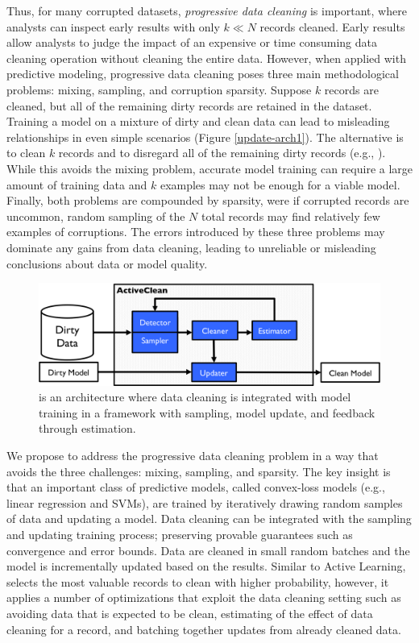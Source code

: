 Thus, for many corrupted datasets, \emph{progressive data cleaning} is important, where analysts can inspect early results with only $k \ll N$ records cleaned.
Early results allow analysts to judge the impact of an expensive or time consuming data cleaning operation without cleaning the entire data.
However, when applied with predictive modeling, progressive data cleaning poses three main methodological problems: mixing, sampling, and corruption sparsity.
Suppose $k$ records are cleaned, but all of the remaining dirty records are retained in the dataset.
Training a model on a mixture of dirty and clean data can lead to misleading relationships in even simple scenarios (Figure \ref{update-arch1}).
The alternative is to clean $k$ records and to disregard all of the remaining dirty records (e.g., \cite{wang1999sample}).
While this avoids the mixing problem, accurate model training can require a large amount of training data and $k$ examples may not be enough for a viable model.
Finally, both problems are compounded by sparsity, were if corrupted records are uncommon, random sampling of the $N$ total records may find relatively few examples of corruptions.
The errors introduced by these three problems may dominate any gains from data cleaning, leading to unreliable or misleading conclusions about data or model quality.

\begin{figure}[t]
\centering
 \includegraphics[width=\columnwidth]{figs/arch.png}
 \caption{\sysfull is an architecture where data cleaning is integrated with model training in a framework with sampling, model update, and feedback through estimation. \label{sys-arch}}\vspace{-2em}
\end{figure}

We propose \sys to address the progressive data cleaning problem in a way that avoids the three challenges: mixing, sampling, and sparsity.
The key insight is that an important class of predictive models, called convex-loss models (e.g., linear regression and SVMs), are trained by iteratively drawing random samples of data and updating a model\cite{bertsekas2011incremental}.
Data cleaning can be integrated with the sampling and updating training process; preserving provable guarantees such as convergence and error bounds.
Data are cleaned in small random batches and the model is incrementally updated based on the results.
Similar to Active Learning, \sys selects the most valuable records to clean with higher probability, however, it applies a number of optimizations that exploit the data cleaning setting such as avoiding data that is expected to be clean, estimating of the effect of data cleaning for a record, and batching together updates from already cleaned data.

